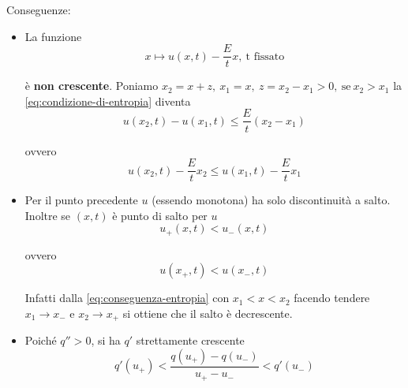 \documentclass[10pt,a4paper,twoside,openright]{book}
\begin{document}
Conseguenze:
\begin{itemize}
	\item La funzione\begin{equation*}
	      x\longmapsto u( x,t) -\frac{E}{t} x,\ \text{t fissato}
	\end{equation*}
	
	è \textbf{non crescente}. Poniamo $\displaystyle x_{2} =x+z,\ x_{1} =x,\ z=x_{2} -x_{1}  >0,\ \text{se} \ x_{2}  >x_{1}$ la \eqref{eq:condizione-di-entropia} diventa\begin{equation*}
	u( x_{2} ,t) -u( x_{1} ,t) \leqslant \frac{E}{t}( x_{2} -x_{1})
	\end{equation*}
	
	ovvero\begin{equation}
	u( x_{2} ,t) -\frac{E}{t} x_{2} \leqslant u( x_{1} ,t) -\frac{E}{t} x_{1}
	\label{eq:conseguenza-entropia}
	\end{equation}
	\item Per il punto precedente $\displaystyle u$ (essendo monotona) ha solo discontinuità a salto. Inoltre se $\displaystyle ( x,t)$ è punto di salto per $\displaystyle u$
	      \begin{equation*}
	      	u_{+}( x,t) < u_{-}( x,t)
	      \end{equation*}
	      
	      ovvero\begin{equation*}
	      u( x_{+} ,t) < u( x_{-} ,t)
	\end{equation*}
	
	Infatti dalla \eqref{eq:conseguenza-entropia} con $\displaystyle x_{1} < x< x_{2}$ facendo tendere $\displaystyle x_{1}\rightarrow x_{-}$ e $\displaystyle x_{2}\rightarrow x_{+}$ si ottiene che il salto è decrescente.
	\item Poiché $\displaystyle q'' >0$, si ha $\displaystyle q'$ strettamente crescente\begin{equation*}
	      q'( u_{+}) < \frac{q( u_{+}) -q( u_{-})}{u_{+} -u_{-}} < q'( u_{-})
	\end{equation*}
	\begin{figure}[htpb]
		\centering

		\begin{tikzpicture}[x=0.75pt,y=0.75pt,yscale=-1,xscale=1]


\end{tikzpicture}
\end{figure}
\end{itemize}
\end{document}
